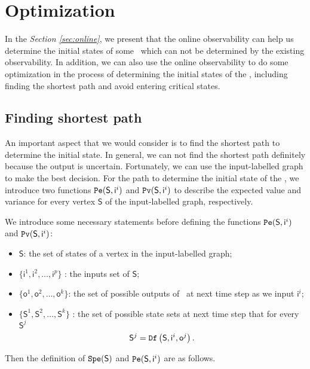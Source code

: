 \section{Optimization}
\label{sec:app}

In the {\em Section \ref{sec:online}}, we present that the online observability can help us determine the initial states of some \BCNs\ which can not be determined by the existing observability. 
In addition, we can also use the online observability to do some optimization in the process of determining the initial states of the \BCNs, including finding the shortest path and avoid entering critical states. 

\subsection{Finding shortest path}
An important aspect that we would consider is to find the shortest path to determine the initial state. In general, we can not find the shortest path definitely because the output is uncertain. Fortunately, we can use the input-labelled graph to make the best decision. For the path to determine the initial state of the \BCNs, we introduce two functions ${\tt Pe}(\mathsf{S},\mathsf{ i}^{i})$ and ${\tt Pv}(\mathsf{S},\mathsf{ i}^{i})$ to describe the expected value and variance for every vertex $\mathsf{S}$ of the input-labelled graph, respectively.%

We introduce some necessary statements before defining the functions ${\tt Pe}(\mathsf{S},\mathsf{ i}^{i})$ and ${\tt Pv}(\mathsf{S},\mathsf{ i}^{i})$:
\begin{itemize}
  \item $\mathsf{S}$: the set of states of a vertex in the input-labelled graph;
  \item $\{\mathsf{ i}^{1},\mathsf{ i}^{2},\ldots, \mathsf{ i}^{p}\}$ : the inputs set of $\mathsf{S}$;
  \item $\{\mathsf{o}^1,\mathsf{o}^2,\ldots,\mathsf{o}^k\}$: the set of possible outputs of \BCN\ at next time step as we input $\mathsf{ i}^{i}$;
 \item $\{\mathsf{S}^{1},\mathsf{S}^{2},\ldots, \mathsf{S}^{k}\}$ : the set of possible state sets at next time step that for every $\mathsf{S}^{j}$ \[\mathsf{S}^{j}={\tt Df}\left(\mathsf{S},\mathsf{i}^{i},\mathsf{o}^{j}\right).\] 
  
\end{itemize} 

Then the definition of ${\tt Spe}(\mathsf{S})$ and ${\tt Pe}(\mathsf{S},\mathsf{ i}^{i})$ are as follows.

